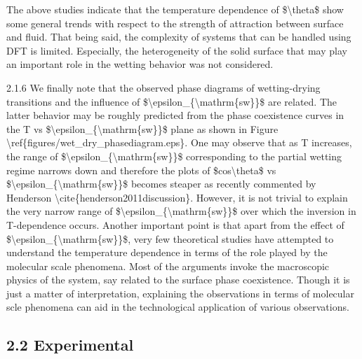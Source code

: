 The above studies indicate that the temperature dependence of \$\textbackslash theta\$ show some general trends with respect to the strength of attraction between surface and fluid. That being said, the complexity of systems that can be handled using DFT is limited. Especially, the heterogeneity of the solid surface that may play an important role in the wetting behavior was not considered.
\par 2.1.6 We finally note that the observed phase diagrams of wetting-drying transitions and the influence of \$\textbackslash epsilon\_\{\textbackslash mathrm\{sw\}\}\$ are related. The latter behavior may be roughly predicted from the phase coexistence curves in the T vs \$\textbackslash epsilon\_\{\textbackslash mathrm\{sw\}\}\$ plane as shown in Figure \textbackslash ref\{figures/wet\_dry\_phasediagram.eps\}. One may observe that as T increases, the range of \$\textbackslash epsilon\_\{\textbackslash mathrm\{sw\}\}\$ corresponding to the partial wetting regime narrows down and therefore the plots of \$cos\textbackslash theta\$ vs \$\textbackslash epsilon\_\{\textbackslash mathrm\{sw\}\}\$ becomes steaper as recently commented by Henderson \textbackslash cite\{henderson2011discussion\}. However, it is not trivial to explain the very narrow range of \$\textbackslash epsilon\_\{\textbackslash mathrm\{sw\}\}\$ over which the inversion in T-dependence occurs. Another important point is that apart from the effect of \$\textbackslash epsilon\_\{\textbackslash mathrm\{sw\}\}\$, very few theoretical studies have attempted to understand the temperature dependence in terms of the role played by the molecular scale phenomena. Most of the arguments invoke the macroscopic physics of the system, say related to the surface phase coexistence. Though it is just a matter of interpretation, explaining the observations in terms of molecular scle phenomena can aid in the technological application of various observations.\subsection{2.2 Experimental}

